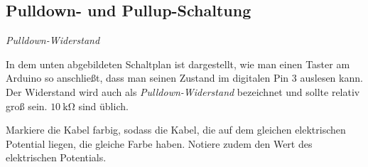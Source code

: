 \documentclass[ngerman, 11pt]{scrreprt}
\begin{document}
	\subsection*{Pulldown- und Pullup-Schaltung}
	
	\begin{aufgabe}\emph{Pulldown-Widerstand}
		
		In dem unten abgebildeten Schaltplan ist dargestellt, wie man einen Taster am Arduino so anschließt, dass man seinen Zustand im digitalen Pin 3 auslesen kann. Der Widerstand wird auch als \emph{Pulldown-Widerstand} bezeichnet und sollte relativ groß sein. $\SI{10}{\kilo\ohm}$ sind üblich.
		
		Markiere die Kabel farbig, sodass die Kabel, die auf dem gleichen elektrischen Potential liegen, die gleiche Farbe haben. Notiere zudem den Wert des elektrischen Potentials.
	\end{aufgabe}
	
\end{document}
